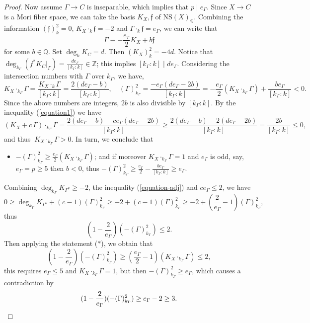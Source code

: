 \documentclass[reqno,oneside]{amsart}
\theoremstyle{definition}
\theoremstyle{plain}
\numberwithin{equation}{section}
\begin{document}
\begin{proof}
 \smallskip
 Now assume  $\Gamma \to C$ is inseparable, which implies that $p\mid e_\Gamma$.
Since $X\to C$ is a Mori fiber space, we can take the basis $K_{X},\mathfrak f$ of $\mathrm{NS}(X)_{\mathbb Q}$.
Combining the information $(\mathfrak f)_k^2=0$, $K_{X}\cdot_k\mathfrak f =-2$ and $\Gamma\cdot_k\mathfrak f = e_\Gamma$, we can write that
$$\Gamma\equiv -\frac{e_\Gamma}{2}K_{X}+ b \mathfrak f$$
for some $b\in \mathbb{Q}$.
Set $\deg_k K_C = d$. Then $(K_X)_k^2 = -4d$. Notice that  $\deg_{k_{\Gamma}} (f^*K_C|_{\Gamma}) = \frac{d e_\Gamma}{[k_\Gamma:k]} \in \mathbb{Z}$; this implies $[k_\Gamma:k] \mid d e_\Gamma$.
Considering the intersection numbers with $\Gamma$ over $k_{\Gamma}$, we have,
$$ K_X\cdot_{k_\Gamma} \Gamma = \frac{K_X\cdot_{k} \Gamma}{[k_\Gamma:k]}= \frac{2(de_\Gamma-b)}{[k_\Gamma:k]},\quad 
(\Gamma)^2_{k_\Gamma}= \frac{-e_\Gamma(de_\Gamma -2b)}{[k_\Gamma:k]} =-\frac{e_\Gamma}{2}(K_X\cdot_{k_\Gamma} \Gamma) + \frac{be_\Gamma}{[k_\Gamma:k]} <0.$$
Since the above numbers are integers, $2b$ is also divisible by $[k_\Gamma:k]$.
By the inequality (\ref{equation1}) we have
$$(K_X+  c\,\Gamma)\cdot_{k_\Gamma} \Gamma = \frac{2(de_\Gamma-b) -ce_\Gamma(de_\Gamma -2b)}{[k_\Gamma:k]} \geq \frac{2(de_\Gamma-b) -2(de_\Gamma -2b)}{[k_\Gamma:k]} = \frac{2b}{[k_\Gamma:k]} \leq 0,$$
and thus $~K_X\cdot_{k_\Gamma} \Gamma >0$.
In turn, we conclude that
\begin{itemize}
\item[($*$)]
$-(\Gamma)^2_{k_\Gamma} \geq \frac{e_\Gamma}{2}(K_X\cdot_{k_\Gamma} \Gamma) $; and if moreover $K_X\cdot_{k_\Gamma} \Gamma = 1$ and $e_\Gamma$ is odd, say, $e_\Gamma = p \geq 5$ then $b<0$, thus $-(\Gamma)^2_{k_\Gamma} \geq \frac{e_\Gamma}{2} - \frac{be_\Gamma}{[k_\Gamma:k]} \geq e_\Gamma$.
\end{itemize}
Combining $\deg_{k_\Gamma}K_{\Gamma^\nu}  \geq -2$, the inequality (\ref{equation-adj}) and $ce_\Gamma \leq 2$, we have
$$0\geq \deg_{k_\Gamma}K_{\Gamma^\nu} + (c-1)  (\Gamma)_{k_\Gamma}^2 \geq -2 + (c-1) (\Gamma)^2_{k_\Gamma}  \geq -2 + (\frac{2}{e_\Gamma}-1) (\Gamma)^2_{k_\Gamma},$$
thus
$$ (1-\frac{2}{e_\Gamma})( -(\Gamma)^2_{k_\Gamma}) \leq 2.$$
Then applying the statement ($*$), we obtain that
$$(1-\frac{2}{e_\Gamma})( -(\Gamma)^2_{k_\Gamma})  \geq (\frac{e_\Gamma}{2} -1)(K_X\cdot_{k_\Gamma} \Gamma) \leq 2,$$
this requires $e_\Gamma \leq 5$ and $K_X\cdot_{k_\Gamma} \Gamma = 1$, but then $-(\Gamma)^2_{k_\Gamma} \geq e_\Gamma$, which causes a contradiction by
\[
  (1-\frac{2}{e_\Gamma})( -(\Gamma)^2_{k_\Gamma}) \geq e_\Gamma -2 \geq 3.
  \hfill\qedhere
\]
\end{proof}
\end{document}
